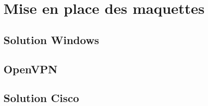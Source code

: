 \section{Mise en place des maquettes}

\subsection{Solution Windows}


\subsection{OpenVPN}


\subsection{Solution Cisco}


\pagebreak
